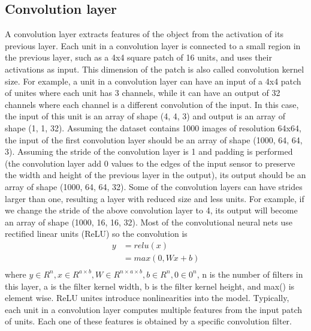 \documentclass[12pt]{WSUThesis}
\theoremstyle{definition}
\begin{document}
\subsection{Convolution layer}
A convolution layer extracts features of the object from the activation of its previous layer.
Each unit in a convolution layer is connected to a small region in the previous layer, such as a 4x4 square patch of 16 units, and uses their activations as input.
This dimension of the patch is also called convolution kernel size.
For example, a unit in a convolution layer can have an input of a 4x4 patch of unites where each unit has 3 channels, while it can have an output of 32 channels where each channel is a different convolution of the input.
In this case, the input of this unit is an array of shape (4, 4, 3) and output is an array of shape (1, 1, 32).
Assuming the dataset contains 1000 images of resolution 64x64, the input of the first convolution layer should be an array of shape
(1000, 64, 64, 3).
Assuming the stride of the convolution layer is 1 and padding is performed (the convolution layer add 0 values to the edges of the input sensor to preserve the width and height of the previous layer in the output), its output should be an array of shape (1000, 64, 64, 32).
Some of the convolution layers can have strides larger than one, resulting a layer with reduced size and less units.
For example, if we change the stride of the above convolution layer to 4, its output will become an array of shape (1000, 16, 16, 32).
Most of the convolutional neural nets use rectified linear units (ReLU) so the convolution is
\begin{align*}
	y
	&= relu(x) \\
	&= max(0, Wx+b) \\
\end{align*}
where $ y \in R^n, x \in R^{a \times b}, W \in R^{n \times a \times b}, b \in R^n , 0 \in 0^n $, n is the number of filters in this layer, a is the filter kernel width, b is the filter kernel height, and max() is element wise.
ReLU unites introduce nonlinearities into the model.
Typically, each unit in a convolution layer computes multiple features from the input patch of units.
Each one of these features is obtained by a specific convolution filter.
\end{document}
